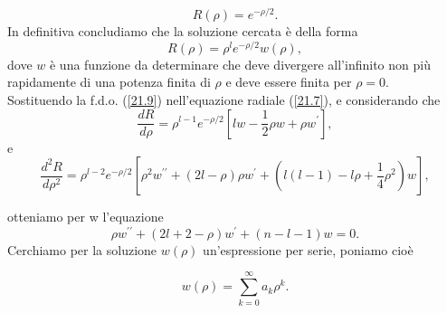 \begin{equation}
R\left(\rho\right)=e^{-\rho/2} .
\end{equation}
In definitiva concludiamo che la soluzione cercata è della forma
\begin{equation}
R\left(\rho\right)=\rho^le^{-\rho/2}w\left(\rho\right) ,
\label{21.9}
\end{equation}
dove $w$ è una funzione da determinare che deve divergere all'infinito non più rapidamente di una potenza finita di $\rho$ e deve essere finita per $\rho=0$.\\
Sostituendo la f.d.o. (\ref{21.9}) nell'equazione radiale (\ref{21.7}), e considerando che 
\begin{equation}
\frac{dR}{d\rho}=\rho^{l-1}e^{-\rho/2}[lw-\frac{1}{2}\rho w+\rho w^\prime] ,
\end{equation}
e
\begin{equation}
\frac{d^2R}{d\rho^2}=\rho^{l-2}e^{-\rho/2}\left[\rho^2w^{\prime\prime}+\left(2l-\rho\right)\rho w^\prime+\left(l\left(l-1\right)-l\rho+\frac{1}{4}\rho^2\right)w\right] ,
\end{equation}

otteniamo per w l'equazione
\begin{equation}
\rho w^{\prime\prime}+\left(2l+2-\rho\right)w^\prime+\left(n-l-1\right)w=0 .
\end{equation}
Cerchiamo per la soluzione $w\left(\rho\right)$ un'espressione per serie, poniamo cioè 

\begin{equation}
w\left(\rho\right)=\sum_{k=0}^\infty a_k \rho^k .
\end{equation}

